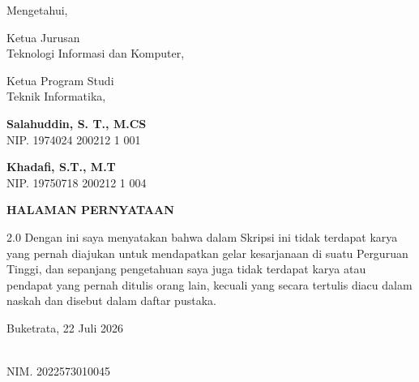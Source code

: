 \documentclass[12pt, a4paper, onecolumn, oneside]{report}
\begin{document}
\begin{center}
Mengetahui,
\end{center}

\vspace{0.3cm}

\noindent
\begin{minipage}[t]{0.4\textwidth}
\parbox[t][1cm][t]{\linewidth}{Ketua Jurusan\\
Teknologi Informasi dan Komputer,}
\end{minipage}\hfill
\begin{minipage}[t]{0.4\textwidth}
\parbox[t][1cm][t]{\linewidth}{Ketua Program Studi\\
Teknik Informatika,}
\end{minipage}

\vspace{2cm}

\noindent
\begin{minipage}[t]{0.4\textwidth}
{\bfseries Salahuddin, S. T., M.CS}\\
NIP. 1974024 200212 1 001
\end{minipage}\hfill
\begin{minipage}[t]{0.4\textwidth}
{\bfseries Khadafi, S.T., M.T}\\
NIP. 19750718 200212 1 004
\end{minipage}

\newpage
{}
{}
\begin{center}
{\fontsize{14pt}{16pt}\selectfont\bfseries HALAMAN PERNYATAAN}
\end{center}
\vspace{0.5cm}

\begin{spacing}{2.0}
\noindent Dengan ini saya menyatakan bahwa dalam Skripsi ini tidak terdapat karya yang pernah diajukan untuk mendapatkan gelar kesarjanaan di suatu Perguruan Tinggi, dan sepanjang pengetahuan saya juga tidak terdapat karya atau pendapat yang pernah ditulis orang lain, kecuali yang secara tertulis diacu dalam naskah dan disebut dalam daftar pustaka.
\end{spacing}

\vspace{3cm}

\begin{flushright}
\begin{minipage}{5cm}
Buketrata, 22 Juli 2026

\vspace{2cm}

\\
NIM. 2022573010045
\end{minipage}
\end{flushright}
\end{document}
